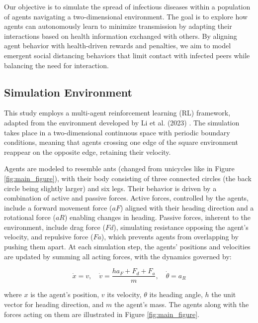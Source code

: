 \documentclass[9pt]{IEEEtran}
\begin{document}
Our objective is to simulate the spread of infectious diseases within a population of agents navigating a two-dimensional environment. The goal is to explore how agents can autonomously learn to minimize transmission by adapting their interactions based on health information exchanged with others. By aligning agent behavior with health-driven rewards and penalties, we aim to model emergent social distancing behaviors that limit contact with infected peers while balancing the need for interaction.

\subsection{Simulation Environment}

This study employs a multi-agent reinforcement learning (RL) framework, adapted from the environment developed by Li et al. (2023) \cite{li2023predator}. The simulation takes place in a two-dimensional continuous space with periodic boundary conditions, meaning that agents crossing one edge of the square environment reappear on the opposite edge, retaining their velocity.

Agents are modeled to resemble ants (changed from unicycles like in Figure \ref{fig:main_figure}), with their body consisting of three connected circles (the back circle being slightly larger) and six legs. Their behavior is driven by a combination of active and passive forces. Active forces, controlled by the agents, include a forward movement force ($aF$) aligned with their heading direction and a rotational force ($aR$) enabling changes in heading. Passive forces, inherent to the environment, include drag force ($Fd$), simulating resistance opposing the agent's velocity, and repulsive force ($Fa$), which prevents agents from overlapping by pushing them apart. At each simulation step, the agents' positions and velocities are updated by summing all acting forces, with the dynamics governed by:

$$ \dot{x} = v, \quad \dot{v} = \frac{ha_F + F_d + F_a}{m}, \quad \dot{\theta} = a_R $$  

where $x$ is the agent's position, $v$ its velocity, $\theta$ its heading angle, $h$ the unit vector for heading direction, and $m$ the agent's mass. The agents along with the forces acting on them are illustrated in Figure \ref{fig:main_figure}.
\end{document}
